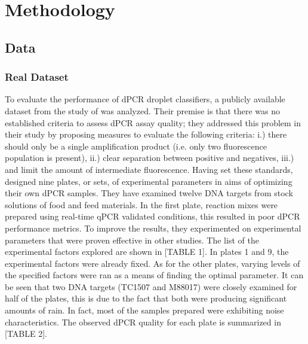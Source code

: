 \chapter{Methodology}
\label{sec:methodology} 

\section{Data}
\label{sec:data}

\subsection{Real Dataset}
\label{sec:ch4_realdata}
To evaluate the performance of dPCR droplet classifiers, a publicly available dataset from the study of  was analyzed. Their premise is that there was no established criteria to assess dPCR assay quality; they addressed this problem in their study by proposing measures to evaluate the following criteria: i.) there should only be a single amplification product (i.e. only two fluorescence population is present), ii.) clear separation between positive and negatives, iii.) and limit the amount of intermediate fluorescence. Having set these standards,  designed nine plates, or sets, of experimental parameters in aims of optimizing their own dPCR samples. They have examined twelve DNA targets from stock solutions of food and feed materials. In the first plate, reaction mixes were prepared using real-time qPCR validated conditions, this resulted in poor dPCR performance metrics. To improve the results, they experimented on experimental parameters that were proven effective in other studies. The list of the experimental factors explored are shown in [TABLE 1]. In plates 1 and 9, the experimental factors were already fixed. As for the other plates, varying levels of the specified factors were ran as a means of finding the optimal parameter. It can be seen that two DNA targets (TC1507 and M88017) were closely examined for half of the plates, this is due to the fact that both were producing significant amounts of rain. In fact, most of the samples prepared were exhibiting noise characteristics. The observed dPCR quality for each plate is summarized in [TABLE 2].  

